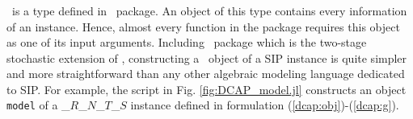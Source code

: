 \subsubsection{\jumpmodel}
\jumpmodel\ is a type defined in \jump\ package. An object of this type contains every information of an instance. Hence, almost every function in the package requires this object as one of its input arguments. Including \structjump\ package which is the two-stage stochastic extension of \jump, constructing a \jumpmodel\ object of a SIP instance is quite simpler and more straightforward than any other algebraic modeling language dedicated to SIP. For example, the script in Fig. \ref{fig:DCAP_model.jl} constructs an object \texttt{model} of a \dcap\_$R$\_$N$\_$T$\_$S$ instance defined in formulation (\ref{dcap:obj})-(\ref{dcap:g}).
%
%
